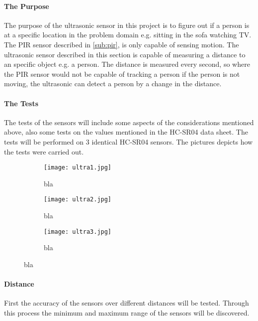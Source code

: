 \paragraph{The Purpose}
The purpose of the ultrasonic sensor in this project is to figure out if a person is at a specific location in the problem domain e.g. sitting in the sofa watching TV. The PIR sensor described in \cref{sub:pir}, is only capable of sensing motion. The ultrasonic sensor described in this section is capable of measuring a distance to an specific object e.g. a person. The distance is measured every second, so where the PIR sensor would not be capable of tracking a person if the person is not moving, the ultrasonic can detect a person by a change in the distance.

\paragraph{The Tests} The tests of the sensors will include some aspects of the considerations mentioned above, also some tests on the values mentioned in the HC-SR04 data sheet\cite{hcsr04}. The tests will be performed on 3 identical HC-SR04 sensors. The pictures  depicts how the tests were carried out.

\begin{figure}[htbp]
  \centering
  \begin{subfigure}{.3\textwidth}
    \centering
    \texttt{[image: ultra1.jpg]}
    \caption{bla}
    \label{fig:ultra1}
  \end{subfigure}
  \begin{subfigure}{.3\textwidth}
    \centering
    \texttt{[image: ultra2.jpg]}
    \caption{bla}
    \label{fig:ultra2}
  \end{subfigure}
  \begin{subfigure}{.3\textwidth}
    \centering
    \texttt{[image: ultra3.jpg]}
    \caption{bla}
    \label{fig:ultra3}
  \end{subfigure}
\end{figure}
  
\paragraph{Distance}
First the accuracy of the sensors over different distances will be tested. Through this process the minimum and maximum range of the sensors will be discovered. 

